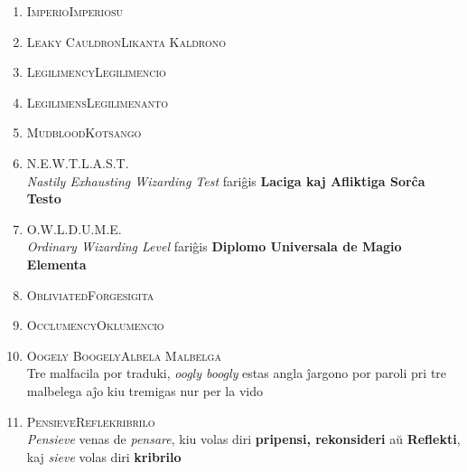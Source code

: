 \begin{enumerate}
\smallskip
\item\label{nomoj:imperiosu} \textsc{Imperio}\dotfill \textsc{Imperiosu}\\
\smallskip
\item\label{nomoj:kaldrono} \textsc{Leaky Cauldron}\dotfill \textsc{Likanta Kaldrono}\\
\smallskip
\item\label{nomoj:legilimencio} \textsc{Legilimency}\dotfill \textsc{Legilimencio}\\
\smallskip
\item\label{nomoj:legilimenanto} \textsc{Legilimens}\dotfill \textsc{Legilimenanto}\\
\smallskip
\item\label{nomoj:kotsango} \textsc{Mudblood}\dotfill \textsc{Kotsango}\\
\smallskip
\item\label{nomoj:last} \textsc{N.E.W.T.}\dotfill \textsc{L.A.S.T.}\\
{\footnotesize \indent \emph{Nastily Exhausting Wizarding Test} fariĝis \textbf{Laciga kaj Afliktiga Sorĉa Testo}}\\
\smallskip
\item\label{nomoj:dume} \textsc{O.W.L.}\dotfill \textsc{D.U.M.E.}\\
{\footnotesize \indent \emph{Ordinary Wizarding Level} fariĝis \textbf{Diplomo Universala de Magio Elementa}}\\
\smallskip
\item\label{nomoj:forgesigita} \textsc{Obliviated}\dotfill \textsc{Forgesigita}\\
\smallskip
\item\label{nomoj:oklumencio} \textsc{Occlumency}\dotfill \textsc{Oklumencio}\\
\smallskip
\item\label{nomoj:malbelga} \textsc{Oogely Boogely}\dotfill \textsc{Albela Malbelga}\\
{\footnotesize \indent Tre malfacila por traduki, \emph{oogly boogly} estas angla ĵargono por paroli pri tre malbelega aĵo kiu tremigas nur per la vido}\\
\smallskip
\item\label{nomoj:reflekribrilo} \textsc{Pensieve}\dotfill \textsc{Reflekribrilo}\\
{\footnotesize \indent \emph{Pensieve} venas de \emph{pensare}, kiu volas diri \textbf{pripensi, rekonsideri} aŭ \textbf{Reflekti}, kaj \emph{sieve} volas diri \textbf{kribrilo}}\\

\end{enumerate}

